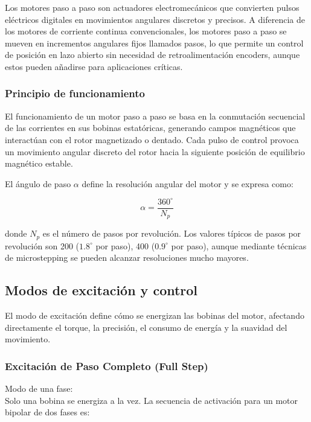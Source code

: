 
Los motores paso a paso son actuadores electromecánicos que convierten pulsos eléctricos digitales en movimientos angulares discretos y precisos. A diferencia de los motores de corriente continua convencionales, los motores paso a paso se mueven en incrementos angulares fijos llamados pasos, lo que permite un control de posición en lazo abierto sin necesidad de retroalimentación encoders, aunque estos pueden añadirse para aplicaciones críticas.

\subsubsection{Principio de funcionamiento}

El funcionamiento de un motor paso a paso se basa en la conmutación secuencial de las corrientes en sus bobinas estatóricas, generando campos magnéticos que interactúan con el rotor magnetizado o dentado. Cada pulso de control provoca un movimiento angular discreto del rotor hacia la siguiente posición de equilibrio magnético estable.

El ángulo de paso $\alpha$ define la resolución angular del motor y se expresa como:

\begin{equation}
\alpha = \frac{360^\circ}{N_p}
\end{equation}

donde $N_p$ es el número de pasos por revolución. Los valores típicos de pasos por revolución son 200 ($1.8^\circ$ por paso), 400 ($0.9^\circ$ por paso), aunque mediante técnicas de microstepping se pueden alcanzar resoluciones mucho mayores.

\subsection{Modos de excitación y control}

El modo de excitación define cómo se energizan las bobinas del motor, afectando directamente el torque, la precisión, el consumo de energía y la suavidad del movimiento.

\subsubsection{Excitación de Paso Completo (Full Step)}

Modo de una fase:\\
\noindent
Solo una bobina se energiza a la vez. La secuencia de activación para un motor bipolar de dos fases es:

